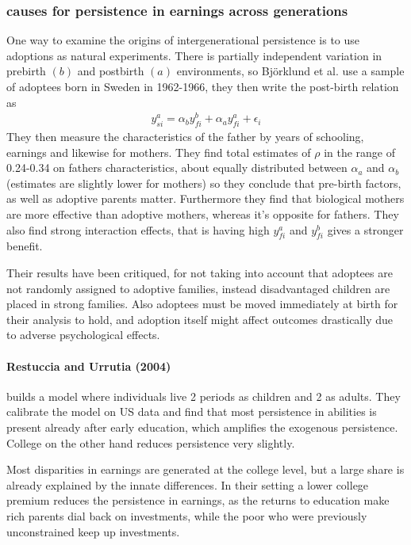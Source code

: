 \documentclass[12pt, a4paper]{article}
\begin{document}
\begin{multicols}{2}
\subsubsection{causes for persistence in earnings across generations}
One way to examine the origins of intergenerational persistence is to use adoptions as natural experiments. There is partially independent variation in prebirth $(b)$ and postbirth $(a)$ environments, so Björklund et al. use a sample of adoptees born in Sweden in 1962-1966, they then write the post-birth relation as
\begin{align*}
y_{si}^a = \alpha_b y_{fi}^b + \alpha_a y_{fi}^a + \epsilon_i
\end{align*}
They then measure the characteristics of the father by years of schooling, earnings and likewise for mothers. They find total estimates of $\rho$ in the range of 0.24-0.34 on fathers characteristics, about equally distributed between $\alpha_a$ and $\alpha_b$ (estimates are slightly lower for mothers) so they conclude that pre-birth factors, as well as adoptive parents matter. Furthermore they find that biological mothers are more effective than adoptive mothers, whereas it's opposite for fathers. They also find strong interaction effects, that is having high $y_{fi}^a$ and $y_{fi}^b$ gives a stronger benefit.

Their results have been critiqued, for not taking into account that adoptees are not randomly assigned to adoptive families, instead disadvantaged children are placed in strong families. Also adoptees must be moved immediately at birth for their analysis to hold, and adoption itself might affect outcomes drastically due to adverse psychological effects.

\paragraph{Restuccia and Urrutia (2004)} builds a model where individuals live 2 periods as children and 2 as adults. They calibrate the model on US data and find that most persistence in abilities is present already after early education, which amplifies the exogenous persistence. College on the other hand reduces persistence very slightly.

Most disparities in earnings are generated at the college level, but a large share is already explained by the innate differences. In their setting a lower college premium reduces the persistence in earnings, as the returns to education make rich parents dial back on  investments, while the poor who were previously unconstrained keep up investments.


\end{multicols}
\end{document}
